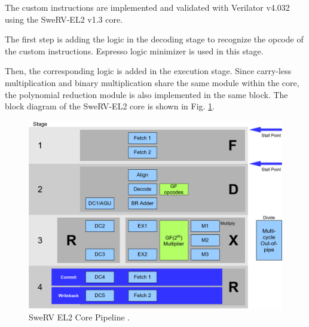 The custom instructions are implemented and validated with Verilator v4.032 using the SweRV-EL2 v1.3 core.

The first step is adding the logic in the decoding stage to recognize the opcode of the custom instructions. 
Espresso logic minimizer \cite{250190} is used in this stage.

Then, the corresponding logic is added in the execution stage. Since carry-less multiplication and binary 
multiplication share the same module within the core, the polynomial reduction module is also implemented 
in the same block. The block diagram of the SweRV-EL2 core is shown in Fig. \ref{fig:swerv}.

\begin{figure}[b]
    \centering
    \includegraphics[width=0.95\linewidth]{img/swerv.png}
    \caption{SweRV EL2 Core Pipeline \cite{swervel2}.}
    \label{fig:swerv}
\end{figure}

